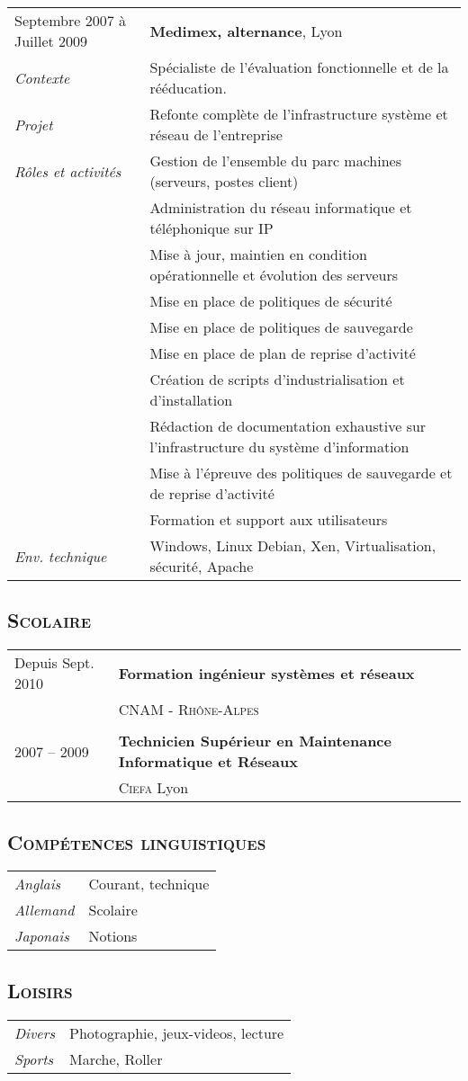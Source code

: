 \documentclass[a4paper,8pt]{article}
\newcommand{\hsubsection}[1]{\subsection*{\fontfamily{phv}\selectfont\textsc{#1}}}
\begin{document}
\begin{tabular}{P{3.5cm}|p{13cm}}
Septembre 2007 à Juillet 2009	& \textbf{Medimex, alternance}, Lyon\\
\textsl{Contexte}		& Spécialiste de l’évaluation fonctionnelle et de la rééducation.\\
\textsl{Projet}			& Refonte complète de l'infrastructure système et réseau de l'entreprise\\
\textsl{Rôles et activités} 	& Gestion de l'ensemble du parc machines (serveurs, postes client)\\
				& Administration du réseau informatique et téléphonique sur IP\\
				& Mise à jour, maintien en condition opérationnelle et évolution des serveurs\\
				& Mise en place de politiques de sécurité\\
				& Mise en place de politiques de sauvegarde\\
				& Mise en place de plan de reprise d'activité\\
				& Création de scripts d'industrialisation et d'installation\\
				& Rédaction de documentation exhaustive sur l'infrastructure du système d'information\\
				& Mise à l'épreuve des politiques de sauvegarde et de reprise d'activité\\
				& Formation et support aux utilisateurs\\
\textsl{Env. technique}		& Windows, Linux Debian, Xen, Virtualisation, sécurité, Apache\\
\end{tabular}

\hsubsection{Scolaire}
\begin{tabular}{P{3.5cm}|p{13cm}}
Depuis Sept. 2010		& \textbf{Formation ingénieur systèmes et réseaux}\\
	& \textsc{CNAM - Rhône-Alpes}\\
 & \\
2007 -- 2009 			& \textbf{Technicien Supérieur en Maintenance Informatique et Réseaux}\\
	& \textsc{Ciefa} Lyon\\
\end{tabular}

\hsubsection{Compétences linguistiques}
\begin{tabular}{P{3.5cm}|p{13cm}}
\textsl{Anglais}		& Courant, technique\\
\textsl{Allemand}		& Scolaire\\
\textsl{Japonais}		& Notions\\
\end{tabular}

\hsubsection{Loisirs}
\begin{tabular}{P{3.5cm}|p{13cm}}
\textsl{Divers}			& Photographie, jeux-videos, lecture\\
\textsl{Sports}			& Marche, Roller\\
\end{tabular}
\end{document}
